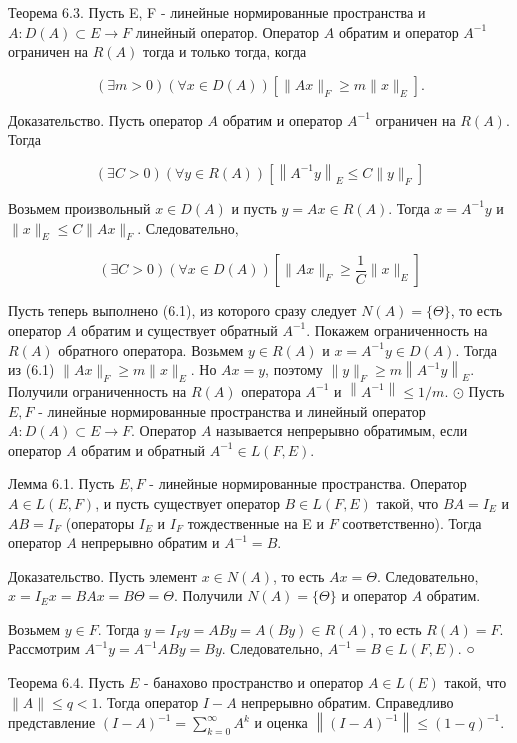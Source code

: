 Теорема 6.3. Пусть E, F - линейные нормированные пространства и $A: D(A) \subset E \rightarrow F$ линейный оператор. Оператор $A$ обратим и оператор $A^{-1}$ ограничен на $R(A)$ тогда и только тогда, когда

$$
(\exists m>0)(\forall x \in D(A))\left[\|A x\|_{F} \geq m\|x\|_{E}\right] .
$$

Доказательство. Пусть оператор $A$ обратим и оператор $A^{-1}$ ограничен на $R(A)$. Тогда

$$
(\exists C>0)(\forall y \in R(A))\left[\left\|A^{-1} y\right\|_{E} \leq C\|y\|_{F}\right]
$$

Возьмем произвольный $x \in D(A)$ и пусть $y=A x \in R(A)$. Тогда $x=A^{-1} y$ и $\|x\|_{E} \leq C\|A x\|_{F}$. Следовательно,

$$
(\exists C>0)(\forall x \in D(A))\left[\|A x\|_{F} \geq \frac{1}{C}\|x\|_{E}\right]
$$

Пусть теперь выполнено (6.1), из которого сразу следует $N(A)=\{\Theta\}$, то есть оператор $A$ обратим и существует обратный $A^{-1}$. Покажем ограниченность на $R(A)$ обратного оператора. Возьмем $y \in R(A)$ и $x=A^{-1} y \in D(A)$. Тогда из (6.1) $\|A x\|_{F} \geq m\|x\|_{E}$. Но $A x=y$, поэтому $\|y\|_{F} \geq m\left\|A^{-1} y\right\|_{E}$. Получили ограниченность на $R(A)$ оператора $A^{-1}$ и $\left\|A^{-1}\right\| \leq 1 / m$. $\odot$ Пусть $E, F$ - линейные нормированные пространства и линейный оператор $A: D(A) \subset E \rightarrow F$. Оператор $A$ называется непрерывно обратимым, если оператор $A$ обратим и обратный $A^{-1} \in L(F, E)$.

Лемма 6.1. Пусть $E, F$ - линейные нормированные пространства. Оператор $A \in L(E, F)$, и пусть существует оператор $B \in L(F, E)$ такой, что $B A=I_{E}$ и $A B=I_{F}$ (операторы $I_{E}$ и $I_{F}$ тождественные на E и $F$ соответственно). Тогда оператор $A$ непрерывно обратим и $A^{-1}=B$.

Доказательство. Пусть элемент $x \in N(A)$, то есть $A x=\Theta$. Следовательно, $x=I_{E} x=B A x=B \Theta=\Theta$. Получили $N(A)=\{\Theta\}$ и оператор $A$ обратим.

Возьмем $y \in F$. Тогда $y=I_{F} y=A B y=A(B y) \in R(A)$, то есть $R(A)=F$. Рассмотрим $A^{-1} y=A^{-1} A B y=B y$. Следовательно, $A^{-1}=B \in L(F, E)$. ○

Теорема 6.4. Пусть $E$ - банахово пространство и оператор $A \in L(E)$ такой, что $\|A\| \leq q<1$. Тогда оператор $I-A$ непрерывно обратим. Справедливо представление $(I-A)^{-1}=\sum_{k=0}^{\infty} A^{k}$ и оценка $\left\|(I-A)^{-1}\right\| \leq(1-q)^{-1}$.

